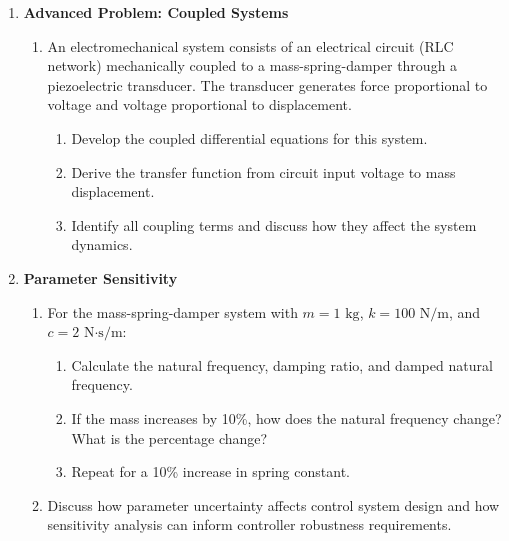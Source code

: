 \begin{enumerate}
\begin{enumerate}
\item Discuss the conditions under which linearization of a nonlinear system produces a valid approximation of the original system's behavior. What factors affect the validity of the linear approximation?

\end{enumerate}

\item \textbf{Advanced Problem: Coupled Systems}
\begin{enumerate}
\item An electromechanical system consists of an electrical circuit (RLC network) mechanically coupled to a mass-spring-damper through a piezoelectric transducer. The transducer generates force proportional to voltage and voltage proportional to displacement.
\begin{enumerate}
\item Develop the coupled differential equations for this system.
\item Derive the transfer function from circuit input voltage to mass displacement.
\item Identify all coupling terms and discuss how they affect the system dynamics.

\end{enumerate}

\end{enumerate}

\item \textbf{Parameter Sensitivity}
\begin{enumerate}
\item For the mass-spring-damper system with $m = 1\text{ kg}$, $k = 100\text{ N/m}$, and $c = 2\text{ N·s/m}$:
\begin{enumerate}
\item Calculate the natural frequency, damping ratio, and damped natural frequency.
\item If the mass increases by 10\%, how does the natural frequency change? What is the percentage change?
\item Repeat for a 10\% increase in spring constant.

\end{enumerate}

\item Discuss how parameter uncertainty affects control system design and how sensitivity analysis can inform controller robustness requirements.

\end{enumerate}

\end{enumerate}

